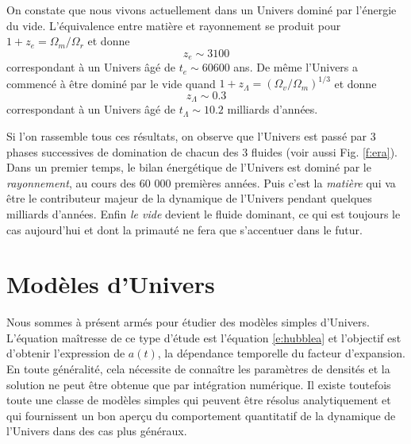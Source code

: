 On constate que nous vivons actuellement dans un Univers dominé par l'énergie du vide. L'équivalence entre matière et rayonnement se produit pour $1+z_e=\Omega_m/\Omega_r$ et donne 
\begin{equation}
z_e\sim 3100
\end{equation}
correspondant à un Univers âgé de $t_e\sim 60 600$ ans. De même l'Univers a commencé à être dominé par le vide quand $1+z_\Lambda=(\Omega_v/\Omega_m)^{1/3}$ et donne
\begin{equation}
z_\Lambda\sim 0.3
\end{equation}
correspondant à un Univers âgé de $t_\Lambda\sim 10.2$ milliards d'années. 

Si l'on rassemble tous ces résultats, on observe que l'Univers est passé par 3 phases successives de domination de chacun des 3 fluides (voir aussi Fig. \ref{f:era}). Dans un premier temps, le bilan énergétique de l'Univers est dominé par le \textit{rayonnement}, au cours des 60 000 premières années. Puis c'est la \textit{matière} qui va  être le contributeur majeur de la dynamique de l'Univers pendant quelques milliards d'années. Enfin \textit{le vide} devient le fluide dominant, ce qui est toujours le cas aujourd'hui et dont la primauté ne fera que s'accentuer dans le futur.

\section{Modèles d'Univers}
Nous sommes à présent armés pour étudier des modèles simples d'Univers. L'équation maîtresse de ce type d'étude est l'équation \ref{e:hubblea} et l'objectif est d'obtenir l'expression de $a(t)$, la dépendance temporelle du facteur d'expansion. En toute généralité, cela nécessite de connaître les paramètres de densités et la solution ne peut être obtenue que par intégration numérique. Il existe toutefois toute une classe de modèles simples qui peuvent être résolus analytiquement et qui fournissent un bon aperçu du comportement quantitatif de la dynamique de l'Univers dans des cas plus généraux.

